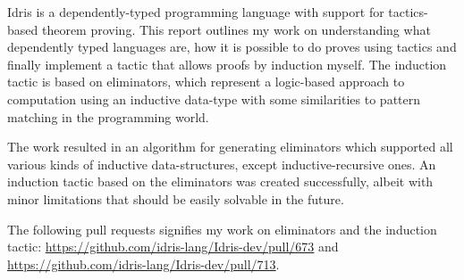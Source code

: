 Idris is a dependently-typed programming language with support for tactics-based theorem proving. This report outlines my work on
understanding what dependently typed languages are, how it is possible to do proves using tactics and finally implement a tactic that
allows proofs by induction myself.
The induction tactic is based on eliminators, which represent a logic-based approach to computation using an inductive data-type with some similarities to pattern matching
in the programming world.

The work resulted in an algorithm for generating eliminators which supported all various kinds of inductive data-structures, except inductive-recursive ones. An induction
tactic based on the eliminators was created successfully, albeit with minor limitations that should be easily solvable in the future.

The following pull requests signifies my work on eliminators and the induction tactic: \url{https://github.com/idris-lang/Idris-dev/pull/673} and \url{https://github.com/idris-lang/Idris-dev/pull/713}.
